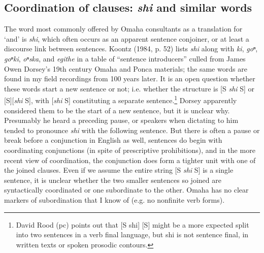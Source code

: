 \documentclass[output=paper]{LSP/langsci}
\begin{document}
\subsection{Coordination of clauses: \textit{shi}  and similar words}  

    The word most commonly offered by Omaha consultants as a translation for `and' is \textit{shi}, which often occurs as an apparent sentence conjoiner, or at least a discourse link between sentences. Koontz (1984, p. 52) lists \textit{shi} along with \textit{ki}, \textit{goⁿ}, \textit{goⁿki}, \textit{oⁿska}, and \textit{egithe} in a table of ``sentence introducers'' culled from James Owen Dorsey's 19th century Omaha and Ponca materials; the same words are found in my field recordings from 100 years later.  It is an open question whether these words start a new sentence or not; i.e. whether the structure is [S \textit{shi} S] or [S][\textit{shi} S], with [\textit{shi} S] constituting a separate sentence.\footnote{David Rood (pc) points out that [S shi] [S] might be a more expected split into two sentences in a verb final language, but shi is not sentence final, in written texts or spoken prosodic contours.}  Dorsey apparently considered them to be the start of a new sentence, but it is unclear why. Presumably he heard a preceding pause, or speakers when dictating to him tended to pronounce \textit{shi} with the following sentence. But there is often a pause or break before a conjunction in English as well, sentences do begin with coordinating conjunctions (in spite of prescriptive prohibitions), and in the more recent view of coordination, the conjunction does form a tighter unit with one of the joined clauses. Even if we assume the entire string [S \textit{shi} S] is a single sentence, it is unclear whether the two smaller sentences so joined are syntactically coordinated or one subordinate to the other. Omaha has no clear markers of subordination that I know of (e.g. no nonfinite verb forms).  
\end{document}
